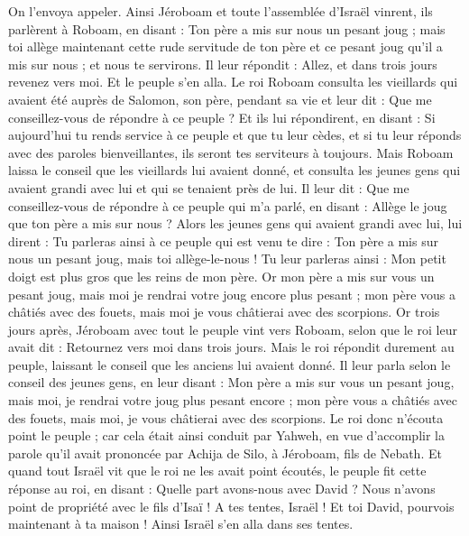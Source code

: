 \begin{multicols}{2}
On l'envoya appeler. Ainsi Jéroboam et toute l'assemblée d'Israël vinrent, ils parlèrent à Roboam, en disant :
Ton père a mis sur nous un pesant joug ; mais toi allège maintenant cette rude servitude de ton père et ce pesant joug qu'il a mis sur nous ; et nous te servirons.
Il leur répondit : Allez, et dans trois jours revenez vers moi. Et le peuple s'en alla.
Le roi Roboam consulta les vieillards qui avaient été auprès de Salomon, son père, pendant sa vie et leur dit : Que me conseillez-vous de répondre à ce peuple ?
Et ils lui répondirent, en disant : Si aujourd'hui tu rends service à ce peuple et que tu leur cèdes, et si tu leur réponds avec des paroles bienveillantes, ils seront tes serviteurs à toujours.
Mais Roboam laissa le conseil que les vieillards lui avaient donné, et consulta les jeunes gens qui avaient grandi avec lui et qui se tenaient près de lui.
Il leur dit : Que me conseillez-vous de répondre à ce peuple qui m'a parlé, en disant : Allège le joug que ton père a mis sur nous ?
Alors les jeunes gens qui avaient grandi avec lui, lui dirent : Tu parleras ainsi à ce peuple qui est venu te dire : Ton père a mis sur nous un pesant joug, mais toi allège-le-nous ! Tu leur parleras ainsi : Mon petit doigt est plus gros que les reins de mon père.
Or mon père a mis sur vous un pesant joug, mais moi je rendrai votre joug encore plus pesant ; mon père vous a châtiés avec des fouets, mais moi je vous châtierai avec des scorpions.
Or trois jours après, Jéroboam avec tout le peuple vint vers Roboam, selon que le roi leur avait dit : Retournez vers moi dans trois jours.
Mais le roi répondit durement au peuple, laissant le conseil que les anciens lui avaient donné.
Il leur parla selon le conseil des jeunes gens, en leur disant : Mon père a mis sur vous un pesant joug, mais moi, je rendrai votre joug plus pesant encore ; mon père vous a châtiés avec des fouets, mais moi, je vous châtierai avec des scorpions.
Le roi donc n'écouta point le peuple ; car cela était ainsi conduit par Yahweh, en vue d'accomplir la parole qu'il avait prononcée par Achija de Silo, à Jéroboam, fils de Nebath.
Et quand tout Israël vit que le roi ne les avait point écoutés, le peuple fit cette réponse au roi, en disant : Quelle part avons-nous avec David ? Nous n'avons point de propriété avec le fils d'Isaï ! A tes tentes, Israël ! Et toi David, pourvois maintenant à ta maison ! Ainsi Israël s'en alla dans ses tentes.

\end{multicols}
